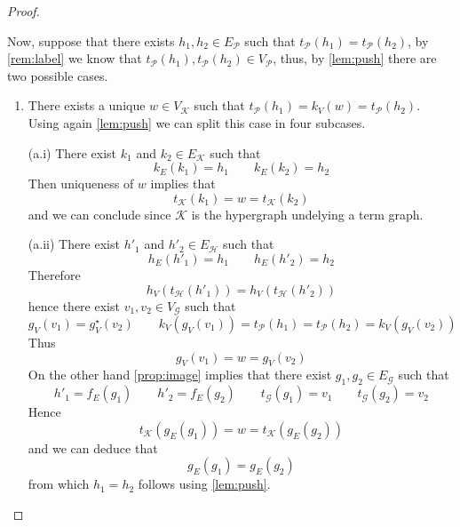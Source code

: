 \documentclass[runningheads,envcountsect]{lmcs}
\theoremstyle{plain}
\theoremstyle{definition}
\begin{document}
\begin{proof}
\begin{center}
	\end{center}	
	 Now, suppose that there exists $h_1, h_2\in E_{\mathcal{P}}$ such that $t_{\mathcal{P}}(h_1)=t_{\mathcal{P}}(h_2)$, by \cref{rem:label}  we know that $t_{\mathcal{P}}(h_1), t_{\mathcal{P}}(h_2)\in V_{\mathcal{P}}$, thus, by \cref{lem:push} there are two possible cases.
	 \begin{enumerate}[label=(\alph*)]
	 	\item There exists a unique $w\in V_{\mathcal{K}}$ such that $t_{\mathcal{P}}(h_1)=k_V(w)=t_{\mathcal{P}}(h_2)$. Using again \cref{lem:push} we can split this case in four subcases.
	 	\medskip 
	 	
	 	\noindent (a.i) There exist $k_1$ and $k_2\in E_{\mathcal{K}}$ such that 
	 	\[k_E(k_1)=h_1 \qquad k_E(k_2)=h_2\]
	 	Then uniqueness of $w$ implies that
	 	\[t_{\mathcal{K}}(k_1)=w=t_{\mathcal{K}}(k_2)\]
	 	and we can conclude since $\mathcal{K}$ is the hypergraph undelying a term graph.
	 	\medskip 
	 	
	 	\noindent (a.ii) There exist $h'_1$ and $h'_2\in E_{\mathcal{H}}$ such that 
	 	\[h_E(h'_1)=h_1 \qquad h_E(h'_2)=h_2\]
	 	Therefore
	 	\[h_V(t_{\mathcal{H}}(h'_1))=h_V(t_{\mathcal{H}}(h'_2))\]
	 	hence there exist $v_1, v_2\in V_{\mathcal{G}}$ such that
	 	\[g_V(v_1)=g^\star_V(v_2) \qquad k_V(g_V(v_1))=t_{\mathcal{P}}(h_1)=t_{\mathcal{P}}(h_2)=k_V(g_V(v_2))\]
	 	Thus 
	 	\[g_V(v_1)=w=g_V(v_2)\]
	 	On the other hand \cref{prop:image} implies that there exist $g_1, g_2\in E_{\mathcal{G}}$ such that
	 	\[h'_1=f_E(g_1) \qquad h'_2=f_E(g_2) \qquad t_{\mathcal{G}}(g_1)=v_1 \qquad t_{\mathcal{G}}(g_2)=v_2\]	
	 Hence
	 \[t_{\mathcal{K}}(g_E(g_1))=w=t_{\mathcal{K}}(g_E(g_2))\]
	 and we can deduce that 	
	 \[g_E(g_1)=g_E(g_2)\]
	from which $h_1=h_2$ follows using \cref{lem:push}.
	 	 \medskip
	 	 

\end{enumerate}
\end{proof}
\end{document}
